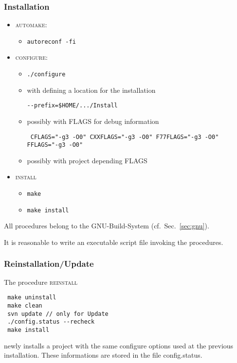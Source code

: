 \subsubsection{Installation}
\begin{itemize}
	\item \textsc{automake}:
	\begin{itemize}
		\item[] \begin{verbatim}autoreconf -fi\end{verbatim}
	\end{itemize}
	\item \textsc{configure}: 
	\begin{itemize}
		\item[] \begin{verbatim}./configure \end{verbatim}
        \item[] with defining a location for the installation 
                \begin{verbatim}--prefix=$HOME/.../Install\end{verbatim}
        \item[] possibly with FLAGS for debug information
		        \begin{verbatim} CFLAGS="-g3 -O0" CXXFLAGS="-g3 -O0" F77FLAGS="-g3 -O0" FFLAGS="-g3 -O0" \end{verbatim}
		\item[] possibly with project depending FLAGS
	\end{itemize}
	\item \textsc{install}
	\begin{itemize}	
		\item \begin{verbatim}make\end{verbatim}
		\item \begin{verbatim}make install\end{verbatim}
	\end{itemize}
\end{itemize}
All procedures belong to the GNU-Build-System (cf.~Sec.~\ref{sec:gnu}).\par
It is reasonable to write an executable script file invoking the procedures.

\subsubsection{Reinstallation/Update}
The procedure \textsc{reinstall}
\begin{verbatim}
 make uninstall 
 make clean
 svn update // only for Update
 ./config.status --recheck
 make install
\end{verbatim}
newly installs a project with the same configure options used at the previous installation. These informations are stored in the file config.status.\par 

